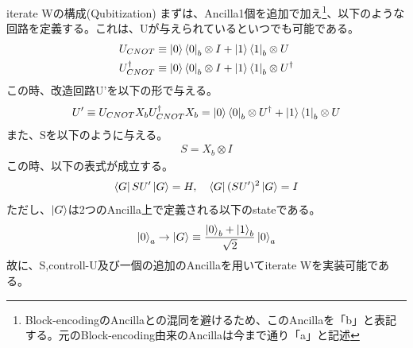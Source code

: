 \documentclass[a4paper,10.5pt]{article}
\numberwithin{equation}{section}
\begin{document}
\begin{resultbox}{iterate Wの構成(Qubitization)}
まずは、Ancilla1個を追加で加え\footnote{Block-encodingのAncillaとの混同を避けるため、このAncillaを「b」と表記する。元のBlock-encoding由来のAncillaは今まで通り「a」と記述}、以下のような回路を定義する。これは、Uが与えられているといつでも可能である。
\begin{align*}
    U_{CNOT}&\equiv\ket{0}\bra{0}_{b}\otimes I+ \ket{1}\bra{1}_{b}\otimes U\\
    U^{\dagger}_{CNOT}&\equiv\ket{0}\bra{0}_{b}\otimes I + \ket{1}\bra{1}_{b}\otimes U^{\dagger}
\end{align*}
この時、改造回路U'を以下の形で与える。
\begin{align*}
    U'\equiv U_{CNOT}X_{b}U^{\dagger}_{CNOT}X_{b}=\ket{0}\bra{0}_{b}\otimes U^{\dagger}+ \ket{1}\bra{1}_{b}\otimes U
\end{align*}
また、Sを以下のように与える。
    \begin{align*}
        S=X_{b}\otimes I
    \end{align*}
この時、以下の表式が成立する。
\begin{align*}
    \bra{G}SU'\ket{G}=H,\quad \bra{G}(SU')^{2}\ket{G}=I
\end{align*}
ただし、$\ket{G}$は2つのAncilla上で定義される以下のstateである。
\begin{align*}
    \ket{0}_{a}\to \ket{G}\equiv\frac{\ket{0}_{b}+\ket{1}_{b}}{\sqrt{2}}\ket{0}_{a}
\end{align*}
故に、S,controll-U及び一個の追加のAncillaを用いてiterate Wを実装可能である。
\end{resultbox}
\end{document}
